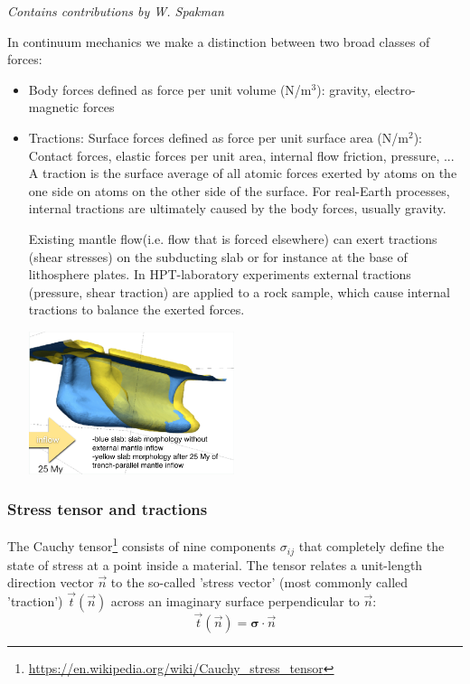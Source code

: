 {\sl Contains contributions by W. Spakman}

In continuum mechanics we make a distinction between two broad classes of forces:
\begin{itemize}
\item Body forces defined as force per unit volume (N/m$^3$): gravity, electro-magnetic forces
\item Tractions: Surface forces defined as force per unit surface area (N/m$^2$):
Contact forces, elastic forces per unit area, internal flow friction, pressure, ...\\
A traction is the surface average of all atomic forces exerted by
atoms on the one side on atoms on the other side of the surface.
For real-Earth processes, internal tractions are ultimately caused by
the body forces, usually gravity.


Existing mantle flow(i.e. flow that is forced elsewhere) can exert
tractions (shear stresses) on the subducting slab or for instance at
the base of lithosphere plates.
In HPT-laboratory experiments external tractions (pressure, shear
traction) are applied to a rock sample, which cause internal
tractions to balance the exerted forces.

\begin{center}
\includegraphics[width=6cm]{images/contmech/spak1}
\end{center}
\end{itemize}

\subsubsection{Stress tensor and tractions}\label{sec:stresstensor}
    

The Cauchy tensor\footnote{\url{https://en.wikipedia.org/wiki/Cauchy_stress_tensor}} 
consists of nine components $\sigma_{ij}$  that completely define the state of stress 
at a point inside a material. 
The tensor relates a unit-length direction vector $\vec{n}$ to the so-called 'stress vector' (most commonly called 'traction') $\vec{t}(\vec{n})$ across an imaginary surface perpendicular to $\vec{n}$:
\[
\vec{t}(\vec n)={\bm \sigma}\cdot {\vec n}
\]

